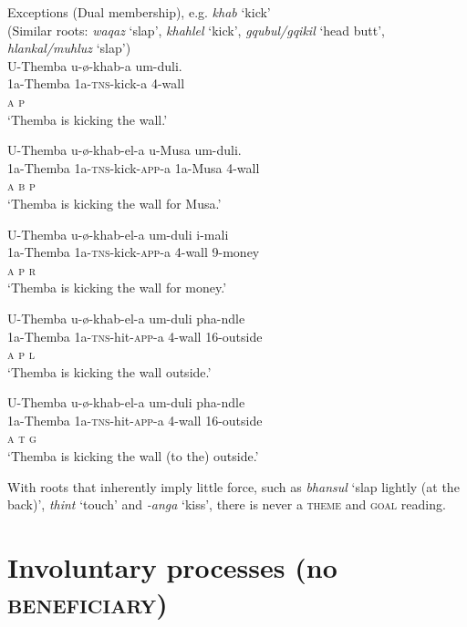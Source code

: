 \documentclass[output=paper]{langsci/langscibook}
\begin{document}
\ea
{Exceptions (Dual membership), e.g. \textit{khab }‘kick’}\\
 (Similar roots: \textit{waqaz} ‘slap’, \textit{khahlel} ‘kick’, \textit{gqubul/gqikil} ‘head butt’, \textit{hlankal/muhluz} ‘slap’)\\
\ea
\gll U-Themba u-ø-khab-a um-duli. \\
 1a-Themba 1a-\textsc{tns}-kick-a 4-wall\\
 \textsc{a p}\\
\glt ‘Themba is kicking the wall.’

\ex
\gll U-Themba u-ø-khab-el-a u-Musa um-duli. \\
 1a-Themba 1a-\textsc{tns}-kick-\textsc{app}-a 1a-Musa 4-wall\\
 \textsc{a b p}\\
\glt ‘Themba is kicking the wall for Musa.’

\ex
\gll U-Themba u-ø-khab-el-a um-duli i-mali\\
 1a-Themba 1a-\textsc{tns}-kick-\textsc{app}-a 4-wall 9-money\\
 \textsc{a p r}\\
\glt ‘Themba is kicking the wall for money.’

\ex
\gll U-Themba u-ø-khab-el-a um-duli pha-ndle \\
 1a-Themba 1a-\textsc{tns}-hit-\textsc{app}-a 4-wall 16-outside\\
 \textsc{a p l}\\
\glt ‘Themba is kicking the wall outside.’

\ex
\gll U-Themba u-ø-khab-el-a um-duli pha-ndle \\
 1a-Themba 1a-\textsc{tns}-hit-\textsc{app}-a 4-wall 16-outside\\
 \textsc{a t g}\\
\glt ‘Themba is kicking the wall (to the) outside.’
\z
\z

With roots that inherently imply little force, such as \textit{bhansul} ‘slap lightly (at the back)’, \textit{thint} ‘touch’ and \textit{-anga} ‘kiss’, there is never a \textsc{theme }and \textsc{goal} reading.

\section{Involuntary processes (no \textsc{beneficiary})}
\end{document}
